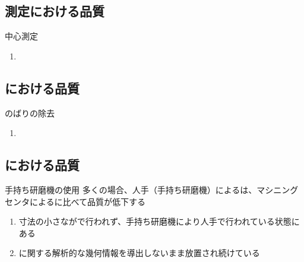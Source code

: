 \subsection{測定における品質\TBW}

\begin{Issues}{\Keyway 中心測定\TBW}
\begin{enumerate}[label=\sarrow]
\item[{\sarrow[red]}]
\end{enumerate}
\end{Issues}


\subsection{\KeywayMilling における品質\TBW}

\begin{Issues}{\KeywayMilling のばりの除去\TBW}
\begin{enumerate}[label=\sarrow]
\item[{\sarrow[red]}]
\end{enumerate}
\end{Issues}


\subsection{\EndFaceChamferMilling における品質}

\begin{Issues}{手持ち研磨機の使用}
多くの場合、人手（手持ち研磨機）による\EndFaceChamferMilling は、マシニングセンタによる\EndFaceChamferMilling に比べて品質が低下する
\begin{enumerate}[label=\sarrow]
\item[{\sarrow[red]}]
寸法の小さな\EndFaceCChamferMilling が\MMC で行われず、手持ち研磨機により人手で行われている状態にある
\item[{\sarrow[red]}] \EndFaceChamferMilling に関する解析的な幾何情報を導出しないまま放置され続けている
\end{enumerate}
\end{Issues}

